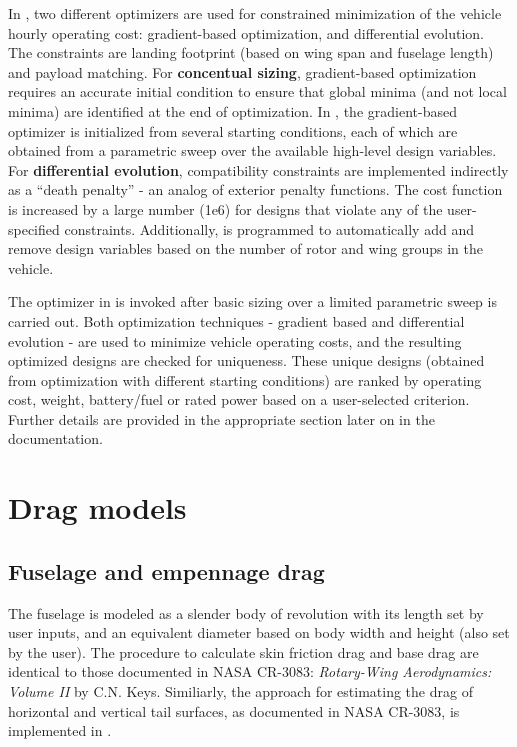 In \hydra, two different optimizers are used for constrained minimization of the vehicle hourly operating cost: gradient-based optimization, and differential evolution. The constraints are landing footprint (based on wing span and fuselage length) and payload matching. For \textbf{concentual sizing}, gradient-based optimization requires an accurate initial condition to ensure that global minima (and not local minima) are identified at the end of optimization. In \hydra, the gradient-based optimizer is initialized from several starting conditions, each of which are obtained from a parametric sweep over the available high-level design variables. For \textbf{differential evolution}, compatibility constraints are implemented indirectly as a ``death penalty'' - an analog of exterior penalty functions. The cost function is increased by a large number (1e6) for designs that violate any of the user-specified constraints. Additionally, \hydra \spc is programmed to automatically add and remove design variables based on the number of rotor and wing groups in the vehicle. 

The optimizer in \hydra \spc is invoked after basic sizing over a limited parametric sweep is carried out. Both optimization techniques - gradient based and differential evolution - are used to minimize vehicle operating costs, and the resulting optimized designs are checked for uniqueness. These unique designs (obtained from optimization with different starting conditions) are ranked by operating cost, weight, battery/fuel or rated power based on a user-selected criterion. Further details are provided in the appropriate section later on in the documentation. 

\section{Drag models}

\subsection{Fuselage and empennage drag}
The fuselage is modeled as a slender body of revolution with its length set by user inputs, and an equivalent diameter based on body width and height (also set by the user). The procedure to calculate skin friction drag and base drag are identical to those documented in NASA CR-3083: \emph{ Rotary-Wing Aerodynamics: Volume II} by C.N. Keys. Similiarly, the approach for estimating the drag of horizontal and vertical tail surfaces, as documented in NASA CR-3083, is implemented in \hydra.

